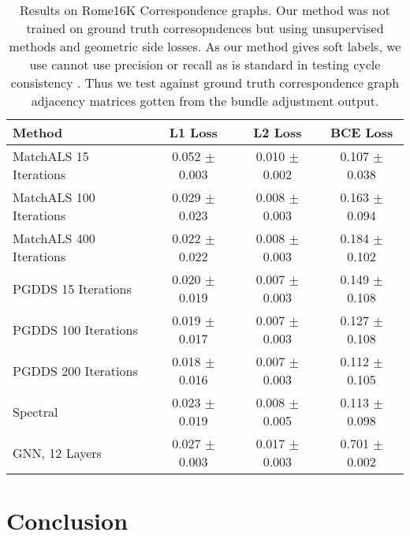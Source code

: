 \documentclass[10pt,twocolumn,letterpaper]{article}
\begin{document}
\begin{table*}
\begin{center}
\begin{tabular}{|l|c|c|c|}
\hline
Method                                                    & L1 Loss           & L2 Loss           & BCE Loss \\
\hline\hline\hline
MatchALS \cite{zhou2015multi} 15 Iterations               & 0.052 $\pm$ 0.003 & 0.010 $\pm$ 0.002 & 0.107 $\pm$ 0.038 \\ \hline
MatchALS \cite{zhou2015multi} 100 Iterations              & 0.029 $\pm$ 0.023 & 0.008 $\pm$ 0.003 & 0.163 $\pm$ 0.094 \\ \hline 
MatchALS \cite{zhou2015multi} 400 Iterations              & 0.022 $\pm$ 0.022 & 0.008 $\pm$ 0.003 & 0.184 $\pm$ 0.102 \\ \hline 
PGDDS \cite{leonardos2016distributed} 15 Iterations       & 0.020 $\pm$ 0.019 & 0.007 $\pm$ 0.003 & 0.149 $\pm$ 0.108 \\ \hline 
PGDDS \cite{leonardos2016distributed} 100 Iterations      & 0.019 $\pm$ 0.017 & 0.007 $\pm$ 0.003 & 0.127 $\pm$ 0.108 \\ \hline 
PGDDS \cite{leonardos2016distributed} 200 Iterations      & 0.018 $\pm$ 0.016 & 0.007 $\pm$ 0.003 & 0.112 $\pm$ 0.105 \\ \hline 
Spectral                                                  & 0.023 $\pm$ 0.019 & 0.008 $\pm$ 0.005 & 0.113 $\pm$ 0.098 \\ \hline \hline
GNN, 12 Layers                                            & 0.027 $\pm$ 0.003 & 0.017 $\pm$ 0.003 & 0.701 $\pm$ 0.002 \\
\hline
\end{tabular}
\end{center}

\caption{
Results on Rome16K Correspondence graphs.
Our method was not trained on ground truth corresopndences but using unsupervised methods and geometric side losses.
As our method gives soft labels, we use cannot use precision or recall as is standard in testing cycle consistency \cite{zhou2015multi}.
Thus we test against ground truth correspondence graph adjacency matrices gotten from the bundle adjustment output.
}
\end{table*}


\section{Conclusion}
\end{document}
